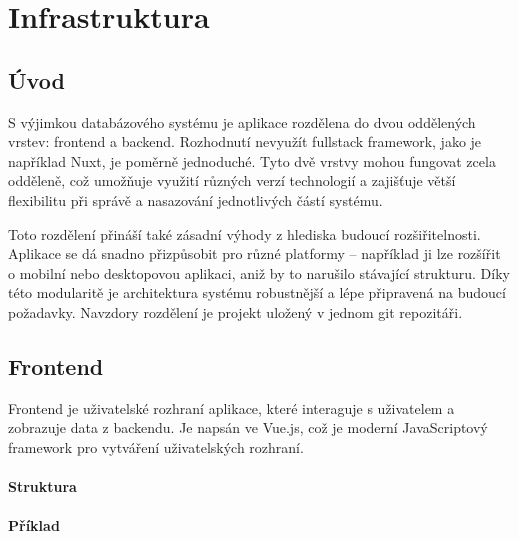 \chapter{Infrastruktura}

\section{Úvod}
S výjimkou databázového systému je aplikace rozdělena do dvou oddělených vrstev: frontend a backend. Rozhodnutí nevyužít fullstack framework, jako je například Nuxt, je poměrně jednoduché. Tyto dvě vrstvy mohou fungovat zcela odděleně, což umožňuje využití různých verzí technologií a zajišťuje větší flexibilitu při správě a nasazování jednotlivých částí systému.

Toto rozdělení přináší také zásadní výhody z hlediska budoucí rozšiřitelnosti. Aplikace se dá snadno přizpůsobit pro různé platformy – například ji lze rozšířit o mobilní nebo desktopovou aplikaci, aniž by to narušilo stávající strukturu. Díky této modularitě je architektura systému robustnější a lépe připravená na budoucí požadavky. Navzdory rozdělení je projekt uložený v jednom git repozitáři.





\section{Frontend}
Frontend je uživatelské rozhraní aplikace, které interaguje s uživatelem a zobrazuje data z backendu. Je napsán ve Vue.js, což je moderní JavaScriptový framework pro vytváření uživatelských rozhraní.

\subsubsection{Struktura}

\subsubsection{Příklad}